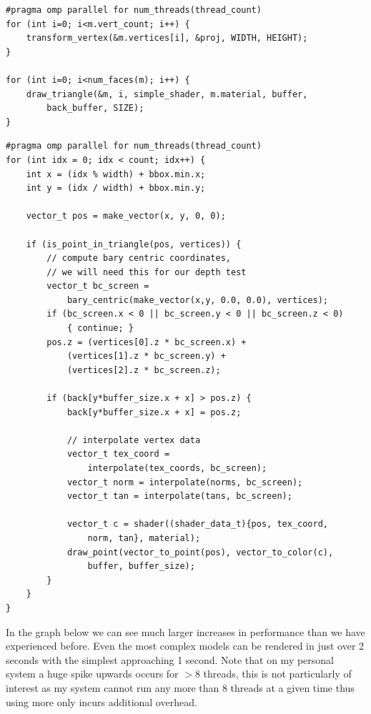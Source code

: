 \documentclass[12pt]{article}
\begin{document}
\begin{verbatim}
#pragma omp parallel for num_threads(thread_count)
for (int i=0; i<m.vert_count; i++) {
	transform_vertex(&m.vertices[i], &proj, WIDTH, HEIGHT);
}

for (int i=0; i<num_faces(m); i++) {
	draw_triangle(&m, i, simple_shader, m.material, buffer, 
		back_buffer, SIZE);
}
\end{verbatim}
\bigbreak
\begin{verbatim}
#pragma omp parallel for num_threads(thread_count)
for (int idx = 0; idx < count; idx++) {
	int x = (idx % width) + bbox.min.x;
	int y = (idx / width) + bbox.min.y;

	vector_t pos = make_vector(x, y, 0, 0);

	if (is_point_in_triangle(pos, vertices)) {
		// compute bary centric coordinates, 
		// we will need this for our depth test
		vector_t bc_screen = 
			bary_centric(make_vector(x,y, 0.0, 0.0), vertices);
		if (bc_screen.x < 0 || bc_screen.y < 0 || bc_screen.z < 0) 
			{ continue; }
		pos.z = (vertices[0].z * bc_screen.x) + 
			(vertices[1].z * bc_screen.y) + 
			(vertices[2].z * bc_screen.z);

		if (back[y*buffer_size.x + x] > pos.z) {
			back[y*buffer_size.x + x] = pos.z;

			// interpolate vertex data
			vector_t tex_coord = 
				interpolate(tex_coords, bc_screen);
			vector_t norm = interpolate(norms, bc_screen);
			vector_t tan = interpolate(tans, bc_screen);

			vector_t c = shader((shader_data_t){pos, tex_coord, 
				norm, tan}, material);
			draw_point(vector_to_point(pos), vector_to_color(c), 
				buffer, buffer_size);
		}
	}
}
\end{verbatim}

In the graph below we can see much larger increases in performance than we have 
experienced before. Even the most complex models can be rendered in just over 2 seconds
with the simplest approaching 1 second. Note that on my personal system a huge spike upwards 
occurs for $>8$ threads, this is not particularly of interest as my system cannot run any more than
8 threads at a given time thus using more only incurs additional overhead.
\end{document}
